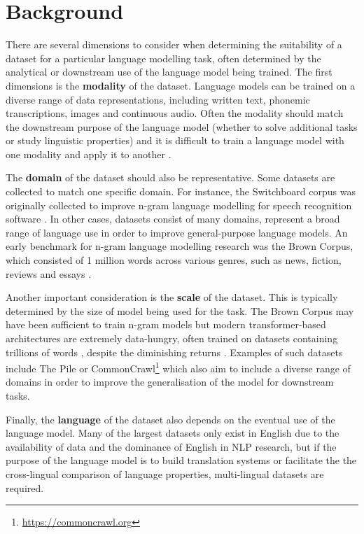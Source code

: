 \section{Background}
\label{sec:dataset-background}

There are several dimensions to consider when determining the suitability of a dataset for a particular language modelling task, often determined by the analytical or downstream use of the language model being trained. The first dimensions is the \textbf{modality} of the dataset. Language models can be trained on a diverse range of data representations, including written text, phonemic transcriptions, images and continuous audio. Often the modality should match the downstream purpose of the language model (whether to solve additional tasks or study linguistic properties) and it is difficult to train a language model with one modality and apply it to another \citep{suvarna-etal-2024-phonologybench,lavechin}.

The \textbf{domain} of the dataset should also be representative. Some datasets are collected to match one specific domain. For instance, the Switchboard corpus was originally collected to improve n-gram language modelling for speech recognition software \citep{godfrey1992switchboard}. In other cases, datasets consist of many domains, represent a broad range of language use in order to improve general-purpose language models. An early benchmark for n-gram language modelling research was the Brown Corpus, which consisted of 1 million words across various genres, such as news, fiction, reviews and essays \citep{francis1979brown}.

Another important consideration is the \textbf{scale} of the dataset. This is typically determined by the size of model being used for the task. The Brown Corpus may have been sufficient to train n-gram models but modern transformer-based architectures are extremely data-hungry, often trained on datasets containing trillions of words \citep{elazar-2024-redpajama}, despite the diminishing returns \citep{kaplan2020scaling}. Examples of such datasets include The Pile \citep{pile} or CommonCrawl\footnote{\url{https://commoncrawl.org}} which also aim to include a diverse range of domains in order to improve the generalisation of the model for downstream tasks.

Finally, the \textbf{language} of the dataset also depends on the eventual use of the language model. Many of the largest datasets only exist in English due to the availability of data and the dominance of English in NLP research, but if the purpose of the language model is to build translation systems or facilitate the the cross-lingual comparison of language properties, multi-lingual datasets are required.

